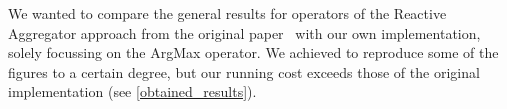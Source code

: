 We wanted to compare the general results for operators of the Reactive Aggregator approach from the original paper~\cite{GeneralIncremental15}
with our own implementation, solely focussing on the ArgMax operator. We achieved to reproduce some of the figures to a certain degree, but our running cost exceeds those of the original implementation (see \autoref{obtained_results}).